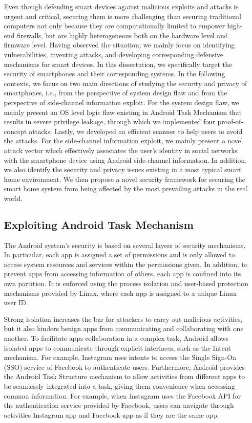 \documentclass[letterpaper,12pt]{article}
\begin{document}
Even though defending smart devices against malicious exploits and attacks is urgent and critical, securing them is more challenging than securing traditional computers not only because they are computationally limited to empower high-end firewalls, but are highly heterogeneous both on the hardware level and firmware level. Having observed the situation,  we mainly focus on identifying vulnerabilities, inventing attacks, and developing corresponding defensive mechanisms for smart devices. In this dissertation, we specifically target the security of smartphones and their corresponding systems. In the following contexts, we focus on two main directions of studying the security and privacy of smartphones, i.e., from the perspective of system design flaw and from the perspective of side-channel information exploit. For the system design flaw, we mainly present an OS level logic flaw existing in Android Task Mechanism that results in severe privilege leakage, through which we implemented four proof-of-concept attacks. Lastly, we developed an efficient scanner to help users to avoid the attacks. For the side-channel information exploit, we mainly present a novel attack vector which effectively associates the user's identity in social networks with the smartphone device using Android side-channel information. In addition, we also identify the security and privacy issues existing in a most typical smart home environment. We then propose a novel security framework for securing the smart home system from being affected by the most prevailing attacks in the real world.

\subsection{Exploiting Android Task Mechanism}
The Android system's security is based on several layers of security
mechanisms. In particular, each app is assigned a set of permissions and is only allowed to access system resources and services within the
permissions given. In addition, to prevent apps from accessing
information of others, each app is confined into its own partition.
It is enforced using the process isolation and user-based protection
mechanisms provided by Linux, where each app is assigned to a unique
Linux user ID.

Strong isolation increases the bar for attackers to carry out
malicious activities, but it also hinders benign apps from
communicating and collaborating with one another. To facilitate apps
collaboration in a complex task, Android allows isolated apps to
communicate through explicit interfaces, such as the Intent
mechanism. For example, Instagram uses intents to access the Single
Sign-On (SSO) service of Facebook to authenticate users.  Furthermore,
Android provides the Android Task Structure mechanism to allow activities
from different apps to be seamlessly integrated into a task, giving
them convenience when accessing common information. For example,
when Instagram uses the Facebook API for the authentication service
provided by Facebook, users can navigate through activities Instagram
app and Facebook app as if they are the same app.
\end{document}

